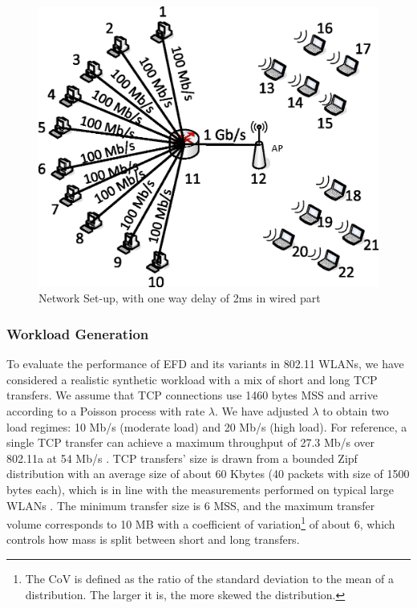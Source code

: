 \documentclass[preprint,12pt]{elsarticle}
\begin{document}
\begin{figure}[!ht]
   \centering
    \includegraphics[width=0.5 \textwidth]{./fig/wireless/setup/wlan_topology_bandwidth.eps}
  \caption{Network Set-up, with one way delay of 2ms in wired part}
  \label{fig:setup}  
\end{figure}

\subsubsection{Workload Generation}

To evaluate the performance of EFD and its variants in 802.11 WLANs, we have considered a realistic synthetic workload with a mix of short and long TCP transfers. We assume that TCP connections use 1460 bytes MSS and arrive according to a Poisson process with rate $\lambda$. We have adjusted $\lambda$ to obtain two load regimes: 10 Mb/s (moderate load) and 20 Mb/s (high load). For reference, a single TCP transfer can achieve a maximum throughput of 27.3 Mb/s over 802.11a at 54 Mb/s \cite{Matthew2003}. TCP transfers'  size is drawn from a bounded Zipf distribution with an average size of about 60 Kbytes (40 packets with size of 1500 bytes each), which is in line with the measurements performed on typical large WLANs \cite{MengWYL04}. The minimum transfer size is 6 MSS, and the maximum transfer volume corresponds to 10 MB with a coefficient of variation\footnote{The CoV is defined as the ratio of the standard deviation to the mean of a distribution. The larger it is, the more skewed the distribution. } of about 6, which controls how  mass is split between short and long transfers. %
\end{document}
